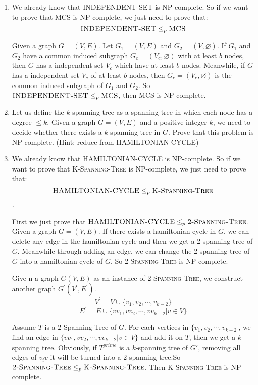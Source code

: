 \documentclass[12pt,a4paper]{article}
\makeatletter
\newtheorem*{solution}{Solution}
\theoremstyle{definition}
\renewenvironment{solution}[1][Solution] {\par\pushQED{\qed}\normalfont\topsep6\p@\@plus6\p@\relax\trivlist\item[\hskip\labelsep\bfseries#1\@addpunct{.}]\ignorespaces}{\popQED\endtrivlist\@endpefalse} \makeatother
\makeatother
\begin{document}
\begin{enumerate}
    \begin{solution}
        We already know that \textsc{INDEPENDENT-SET} is NP-complete. So if we want to prove that MCS is NP-complete, we just need to prove that: $$\textsc{INDEPENDENT-SET}\leq_p\textsc{MCS}$$

        Given a graph $ G = (V,E) $. Let $ G_1 = (V,E) $ and $ G_2 = (V,\varnothing ) $. If $ G_1 $ and $ G_2 $ have a common induced subgraph $G_c = (V_c, \varnothing)$ with at least $b$ nodes, then $ G $ has a independent set $ V_c $ which have at least $ b $ nodes. Meanwhile, if $ G $ has a independent set $ V_c $ of at least $ b $ nodes, then $G_c = (V_c, \varnothing)$ is the common induced subgraph of $ G_1 $ and $ G_2 $. So $\textsc{INDEPENDENT-SET}\leq_p\textsc{MCS}$, then \textsc{MCS} is NP-complete.
    \end{solution}

    \item Let us define the $k$-spanning tree as a spanning tree in which each node has a degree $\leqslant k$. Given a graph $G= (V,E)$ and a positive integer $k$, we need to decide whether there exists a $k$-spanning tree in $G$. Prove that this problem is NP-complete. (Hint: reduce from \textsc{HAMILTONIAN-CYCLE})
    
    \begin{solution}
        We already know that \textsc{HAMILTONIAN-CYCLE} is NP-complete. So if we want to prove that \textsc{K-Spanning-Tree} is NP-complete, we just need to prove that:
        $$\textsc{HAMILTONIAN-CYCLE}\leq_p\textsc{K-Spanning-Tree}$$.

        First we just prove that $\textsc{HAMILTONIAN-CYCLE}\leq_p\textsc{2-Spanning-Tree}$.
        Given a graph $G= (V,E)$. If there exists a hamiltonian cycle in $ G $, we can delete any edge in the hamiltonian cycle and then we get a 2-spanning tree of $ G $. Meanwhile through adding an edge, we can change the 2-spanning tree of $ G $ into a  hamiltonian cycle of $ G $. So \textsc{2-Spanning-Tree} is NP-complete.

        Give n a graph $G(V,E)$ as an instance of \textsc{2-Spanning-Tree}, we construct another graph $G^{\prime}(V^{\prime},E^{\prime})$. 
        $$ V^{\prime} = V \cup \{v_1, v_2, \cdots, v_{k-2}\}$$
        $$ E^{\prime} = E \cup \{vv_1, vv_2, \cdots, vv_{k-2}|v\in V\}$$

        Assume $ T $ is a 2-Spanning-Tree of $ G $. For each vertices in $ \{v_1, v_2, \cdots, v_{k-2}\ $, we find an edge in $ \{vv_1, vv_2, \cdots, vv_{k-2}|v\in V\} $ and add it on $ T $, then we get a $ k $-spanning tree. Obviously, if $ T^{prime} $ is a $ k $-spanning tree of $ G' $, removing all edges of $ v_iv $ it will be turned into a $ 2 $-spanning tree.So $\textsc{2-Spanning-Tree}\leq_p\textsc{K-Spanning-Tree}$. Then \textsc{K-Spanning-Tree} is NP-complete.


\end{solution}
\end{enumerate}
\end{document}
